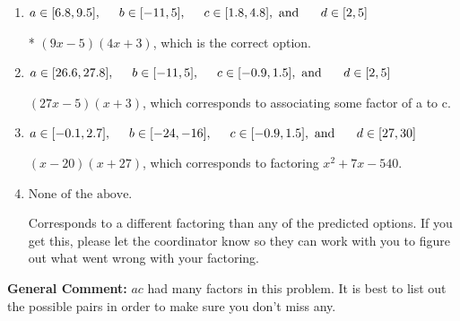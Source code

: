 \documentclass{extbook}[14pt]
\begin{document}
\begin{enumerate}
{\begin{enumerate}[label=\Alph*.]
 $(4x -5)(8x + 3)$, which corresponds to associating some factor of c to a.
\item \( a \in [6.8, 9.5], \hspace*{5mm} b \in [-11, 5], \hspace*{5mm} c \in [1.8, 4.8], \text{ and } \hspace*{5mm} d \in [2, 5] \)

* $(9x -5)(4x + 3)$, which is the correct option.
\item \( a \in [26.6, 27.8], \hspace*{5mm} b \in [-11, 5], \hspace*{5mm} c \in [-0.9, 1.5], \text{ and } \hspace*{5mm} d \in [2, 5] \)

 $(27x -5)(x + 3)$, which corresponds to associating some factor of a to c.
\item \( a \in [-0.1, 2.7], \hspace*{5mm} b \in [-24, -16], \hspace*{5mm} c \in [-0.9, 1.5], \text{ and } \hspace*{5mm} d \in [27, 30] \)

 $(x -20)(x + 27)$, which corresponds to factoring $x^{2} +7 x -540$.
\item \( \text{None of the above.} \)

 Corresponds to a different factoring than any of the predicted options. If you get this, please let the coordinator know so they can work with you to figure out what went wrong with your factoring.
\end{enumerate}

\textbf{General Comment:} $ac$ had many factors in this problem. It is best to list out the possible pairs in order to make sure you don't miss any.
}
\end{enumerate}
\end{document}
